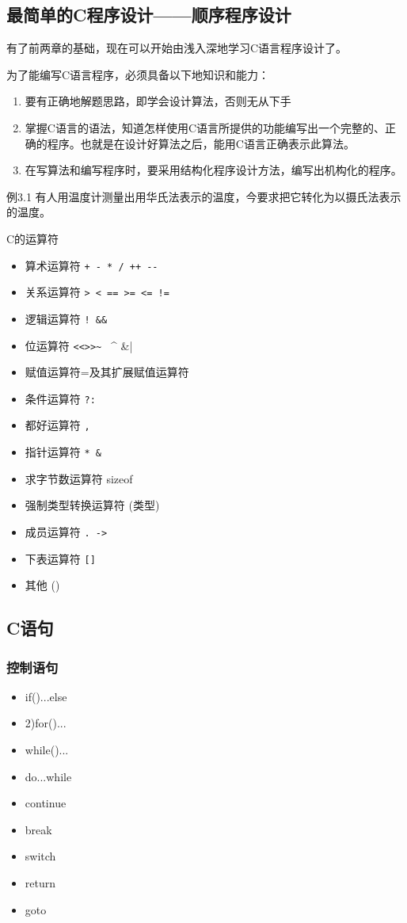 \begin{lslisting}
\begin{enumerate}
\chapter{最简单的C程序设计——顺序程序设计}

有了前两章的基础，现在可以开始由浅入深地学习C语言程序设计了。

为了能编写C语言程序，必须具备以下地知识和能力：
\begin{enumerate}
	\item 要有正确地解题思路，即学会设计算法，否则无从下手
	\item 掌握C语言的语法，知道怎样使用C语言所提供的功能编写出一个完整的、正确的程序。也就是在设计好算法之后，能用C语言正确表示此算法。
	\item 在写算法和编写程序时，要采用结构化程序设计方法，编写出机构化的程序。
\end{enumerate}
例3.1 有人用温度计测量出用华氏法表示的温度，今要求把它转化为以摄氏法表示的温度。

C的运算符
\begin{itemize}
	\item 算术运算符	\verb |+ - * / ++ --|
	\item 关系运算符	\verb |> < == >= <= !=|
	\item 逻辑运算符 \verb |! && |
	\item 位运算符		\verb |<<>>~ | ^ &|
	\item 赋值运算符=及其扩展赋值运算符
	\item 条件运算符	\verb |?:|
	\item 都好运算符	\verb |,|
	\item 指针运算符	\verb |* &|
	\item 求字节数运算符	sizeof
	\item 强制类型转换运算符	(类型)
	\item 成员运算符	\verb |. ->|
	\item 下表运算符	\verb|[]|
	\item 其他  ()
\end{itemize}

\section{C语句}

\subsection{控制语句}
\begin{itemize}
	\item if()...else
	\item 2)for()...
	\item while()...
	\item do...while
	\item continue
	\item break
	\item switch
	\item return 
	\item goto
\end{itemize}

\end{enumerate}
\end{lslisting}
